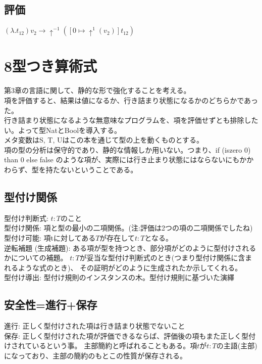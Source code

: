 \documentclass[a4paper,10pt]{article}
\begin{document}
\subsection*{評価}
$(\lambda. t_{12}) v_2 \rightarrow \uparrow^{-1}([0 \mapsto \uparrow^{1}(v_2)]t_{12})$

\section*{8型つき算術式}
第3章の言語に関して、静的な形で強化することを考える。 \\
項を評価すると、結果は値になるか、行き詰まり状態になるかのどちらかであった。\\
行き詰まり状態になるような無意味なプログラムを、項を評価せずとも排除したい。よって型NatとBoolを導入する。\\
メタ変数はS, T, Uはこの本を通じて型の上を動くものとする。\\
項の型の分析は保守的であり、静的な情報しか用いない。つまり、if (iszero 0) than 0 else false
のような項が、実際には行き止まり状態にはならないにもかかわらず、型を持たないということである。
\subsection*{型付け関係}
型付け判断式: $t:T$のこと\\
型付け関係: 項と型の最小の二項関係。(注:評価は2つの項の二項関係でしたね)\\
型付け可能: 項tに対してある$T$が存在して$t:T$となる。\\
逆転補題 (生成補題): ある項が型を持つとき、部分項がどのように型付けされるかについての補題。
$t:T$が妥当な型付け判断式のとき(つまり型付け関係に含まれるような式のとき)、
その証明がどのように生成されたか示してくれる。\\
型付け導出: 型付け規則のインスタンスの木。型付け規則に基づいた演繹\\
\subsection*{安全性=進行+保存}
進行: 正しく型付けされた項は行き詰まり状態でないこと\\
保存: 正しく型付けされた項が評価できるならば、評価後の項もまた正しく型付けされているという事。
主部簡約と呼ばれることもある。項$t$が$t:T$の主語(主部)になっており、主部の簡約のもとこの性質が保存される。
\end{document}
